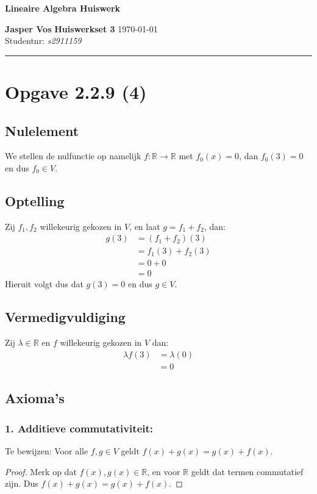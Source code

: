 \documentclass{article}
\newcommand{\R}{\mathbb{R}}
\begin{document}
{\Large \textbf{Lineaire Algebra Huiswerk}}

\bigskip

\textbf{Jasper Vos} \hfill \textbf{Huiswerkset 3} \hfill \today \\
Studentnr: \emph{s2911159}

\rule{\textwidth}{2pt}

\bigskip

\section*{Opgave 2.2.9 (4)}
\subsection*{Nulelement}
We stellen de nulfunctie op namelijk $f: \R \rightarrow \R$ met $f_0(x) = 0$, dan $f_0(3) = 0$ en dus $f_0 \in V$.
\subsection*{Optelling}
Zij $f_1, f_2$ willekeurig gekozen in $V$, en laat $g = f_1 + f_2$, dan:
\begin{align*}
    g(3) & = (f_1 + f_2)(3)  \\
         & = f_1(3) + f_2(3) \\
         & = 0 + 0           \\
         & = 0
\end{align*}
Hieruit volgt dus dat $g(3) = 0$ en dus $g \in V$.
\subsection*{Vermedigvuldiging}
Zij $\lambda \in \R$ en $f$ willekeurig gekozen in $V$ dan:
\begin{align*}
    \lambda f(3) & = \lambda (0) \\
                 & = 0
\end{align*}
\subsection*{Axioma's}
\subsubsection*{1. Additieve commutativiteit:}
Te bewijzen: Voor alle $f, g \in V$ geldt $f(x) + g(x) = g(x) + f(x)$.
\begin{proof}
    Merk op dat $f(x), g(x) \in \R$, en voor $\R$ geldt dat termen commutatief zijn.
    Dus $f(x) + g(x) = g(x) + f(x)$.
\end{proof}
\end{document}
